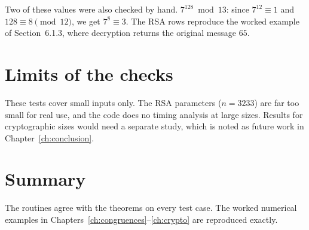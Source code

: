 Two of these values were also checked by hand. $7^{128}\bmod 13$: since $7^{12}\equiv 1$ and $128\equiv 8\pmod{12}$, we get $7^8\equiv 3$. The RSA rows reproduce the worked example of Section~6.1.3, where decryption returns the original message $65$.

\section{Limits of the checks}

These tests cover small inputs only. The RSA parameters ($n=3233$) are far too small for real use, and the code does no timing analysis at large sizes. Results for cryptographic sizes would need a separate study, which is noted as future work in Chapter~\ref{ch:conclusion}.

\section{Summary}

The routines agree with the theorems on every test case. The worked numerical examples in Chapters~\ref{ch:congruences}--\ref{ch:crypto} are reproduced exactly.
